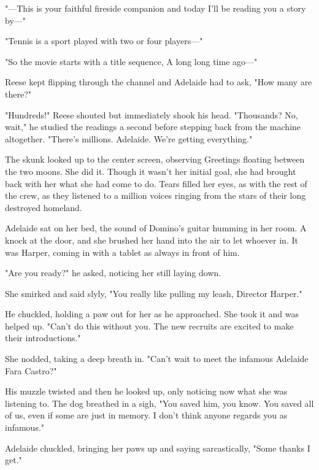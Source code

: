 "---This is your faithful fireside companion and today I'll be reading you a story by---"

"Tennis is a sport played with two or four players---"

"So the movie starts with a title sequence, A long long time ago---"

Reese kept flipping through the channel and Adelaide had to ask, "How many are there?"

"Hundreds!" Reese shouted but immediately shook his head. "Thousands? No, wait," he studied the readings a second before stepping back from the machine altogether. "There's millions. Adelaide. We're getting everything."

The skunk looked up to the center screen, observing Greetings floating between the two moons. She did it. Though it wasn't her initial goal, she had brought back with her what she had come to do. Tears filled her eyes, as with the rest of the crew, as they listened to a million voices ringing from the stars of their long destroyed homeland.\pagebreak

\vspace{0.5cm}

\secdiv

\vspace{0.5cm}

Adelaide sat on her bed, the sound of Domino's guitar humming in her room. A knock at the door, and she brushed her hand into the air to let whoever in. It was Harper, coming in with a tablet as always in front of him.

"Are you ready?" he asked, noticing her still laying down.

She smirked and said slyly, "You really like pulling my leash, Director Harper."

He chuckled, holding a paw out for her as he approached. She took it and was helped up. "Can't do this without you. The new recruits are excited to make their introductions."

She nodded, taking a deep breath in. "Can't wait to meet the infamous Adelaide Fara Castro?"

His muzzle twisted and then he looked up, only noticing now what she was listening to. The dog breathed in a sigh, "You saved him, you know. You saved all of us, even if some are just in memory. I don't think anyone regards you as infamous."

Adelaide chuckled, bringing her paws up and saying sarcastically, "Some thanks I get."

